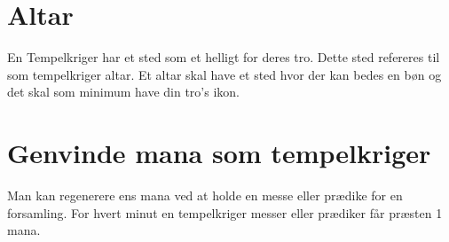\section{Altar}
En Tempelkriger har et sted som et helligt for deres tro. Dette sted refereres til som tempelkriger altar. Et altar skal have et sted hvor der kan bedes en bøn og det skal som minimum have din tro's ikon.

\section{Genvinde mana som tempelkriger}
Man kan regenerere ens mana ved at holde en messe eller prædike for en forsamling. For hvert minut en tempelkriger messer eller prædiker får præsten 1 mana.
